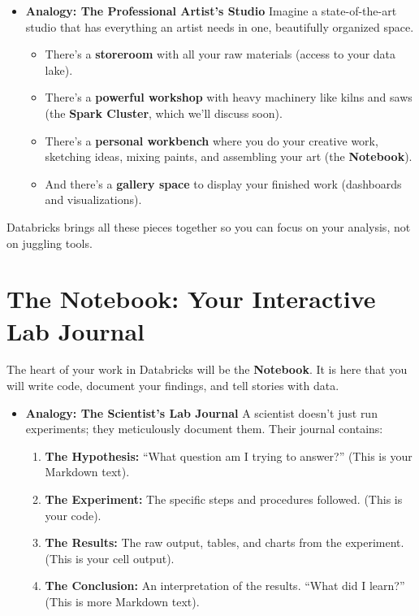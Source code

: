 \documentclass[
  letterpaper,
  DIV=11,
  numbers=noendperiod]{scrreprt}
\providecommand{\tightlist}{%
  \setlength{\itemsep}{0pt}\setlength{\parskip}{0pt}}
\begin{document}
\begin{itemize}
\tightlist
\item
  \textbf{Analogy: The Professional Artist's Studio} Imagine a
  state-of-the-art studio that has everything an artist needs in one,
  beautifully organized space.

  \begin{itemize}
  \tightlist
  \item
    There's a \textbf{storeroom} with all your raw materials (access to
    your data lake).
  \item
    There's a \textbf{powerful workshop} with heavy machinery like kilns
    and saws (the \textbf{Spark Cluster}, which we'll discuss soon).
  \item
    There's a \textbf{personal workbench} where you do your creative
    work, sketching ideas, mixing paints, and assembling your art (the
    \textbf{Notebook}).
  \item
    And there's a \textbf{gallery space} to display your finished work
    (dashboards and visualizations).
  \end{itemize}
\end{itemize}

Databricks brings all these pieces together so you can focus on your
analysis, not on juggling tools.

\section*{The Notebook: Your Interactive Lab
Journal}\label{the-notebook-your-interactive-lab-journal}


The heart of your work in Databricks will be the \textbf{Notebook}. It
is here that you will write code, document your findings, and tell
stories with data.

\begin{itemize}
\tightlist
\item
  \textbf{Analogy: The Scientist's Lab Journal} A scientist doesn't just
  run experiments; they meticulously document them. Their journal
  contains:

  \begin{enumerate}
  \def\labelenumi{\arabic{enumi}.}
  \tightlist
  \item
    \textbf{The Hypothesis:} ``What question am I trying to answer?''
    (This is your Markdown text).
  \item
    \textbf{The Experiment:} The specific steps and procedures followed.
    (This is your code).
  \item
    \textbf{The Results:} The raw output, tables, and charts from the
    experiment. (This is your cell output).
  \item
    \textbf{The Conclusion:} An interpretation of the results. ``What
    did I learn?'' (This is more Markdown text).
  \end{enumerate}
\end{itemize}
\end{document}
